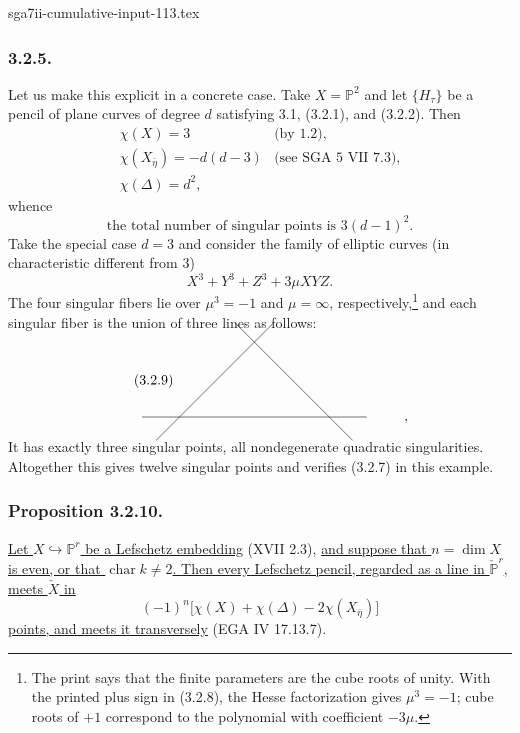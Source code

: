\begin{filecontents*}{sga7ii-cumulative-input-113.tex}
\subsubsection*{3.2.5.}
Let us make this explicit in a concrete case.  Take $X=\mathbb P^2$ and let
$\{H_\tau\}$ be a pencil of plane curves of degree $d$ satisfying 3.1,
(3.2.1), and (3.2.2).  Then
\begin{equation}\tag{3.2.6}
\begin{array}{ll}
\chi(X)=3 & \text{(by 1.2)},\\[4pt]
\chi(X_{\bar\eta})=-d(d-3) & \text{(see SGA 5 VII 7.3)},\\[4pt]
\chi(\Delta)=d^2,&
\end{array}
\end{equation}
whence
\begin{equation}\tag{3.2.7}
\text{the total number of singular points is }3(d-1)^2.
\end{equation}
Take the special case $d=3$ and consider the family of elliptic curves
(in characteristic different from $3$)
\begin{equation}\tag{3.2.8}
X^3+Y^3+Z^3+3\mu XYZ.
\end{equation}
The four singular fibers lie over $\mu^3=-1$ and $\mu=\infty$,
respectively,\footnote{The print says that the finite parameters are the
cube roots of unity.  With the printed plus sign in (3.2.8), the Hesse
factorization gives $\mu^3=-1$; cube roots of $+1$ correspond to the
polynomial with coefficient $-3\mu$.}
and each singular fiber is the union of three lines as follows:
\begin{equation}\tag{3.2.9}
\begin{tikzcd}[row sep=4.5em,column sep=4.5em]
{} & {} \arrow[dl,dash,shorten <=-9mm,shorten >=-9mm]
        \arrow[dr,dash,shorten <=-9mm,shorten >=-9mm] & {} & {} \\
{} \arrow[rr,dash,shorten <=-11mm,shorten >=-11mm] & {} & {} & {,}
\end{tikzcd}
\end{equation}
It has exactly three singular points, all nondegenerate quadratic
singularities.  Altogether this gives twelve singular points and verifies
(3.2.7) in this example.

\subsubsection*{Proposition 3.2.10.}
\underline{Let $X\hookrightarrow\mathbb P^r$ be a Lefschetz embedding}
(XVII 2.3), \underline{and suppose that $n=\dim X$ is even, or that
$\operatorname{char}k\ne2$.  Then every Lefschetz pencil, regarded as a
line in $\check{\mathbb P}^{r}$, meets $\check X$ in}
\begin{equation}\tag{3.2.11}
(-1)^n\bigl[\chi(X)+\chi(\Delta)-2\chi(X_{\bar\eta})\bigr]
\end{equation}
\underline{points, and meets it transversely} (EGA IV 17.13.7).


\end{filecontents*}
